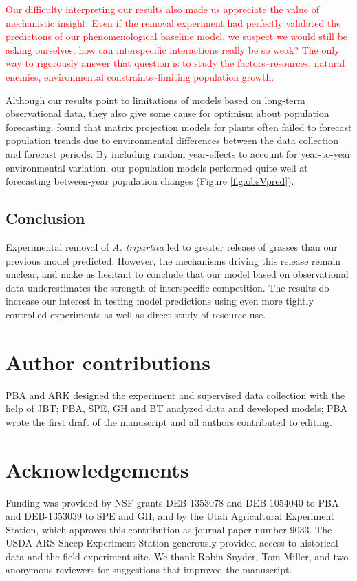 \documentclass[11pt]{article}
\newcommand{\new}{\textcolor{red}}
\begin{document}
\begin{doublespacing}
\new{Our difficulty interpreting our results also made us appreciate the value of mechanistic insight. Even if the removal experiment had perfectly validated the predictions of our phenomenological baseline model, we suspect we would still be asking ourselves, how can interspecific interactions really be so weak? The only way to rigorously answer that question is to study the factors--resources, natural enemies, environmental constraints--limiting population growth. }

Although our results point to limitations of models based on long-term observational data, they also give some cause for optimism about population forecasting. \citet{Crone2013} found that matrix projection models for plants often failed to forecast population trends due 
to environmental differences between the data collection and forecast periods. 
By including random year-effects to account for year-to-year environmental variation, our population models performed quite well
at forecasting between-year population changes (Figure \ref{fig:obsVpred}). 

\subsection*{Conclusion}

Experimental removal of \textit{A. tripartita} led to greater release of grasses than our previous model predicted. However, the mechanisms driving this release remain unclear, and make us hesitant to conclude that our model based on observational data underestimates the strength of interspecific competition. The results do increase our interest in testing model predictions using even more tightly controlled experiments as well as direct study of resource-use.

\section*{Author contributions}
PBA and ARK designed the experiment and supervised data collection with the help of JBT; PBA, SPE, GH and BT analyzed data and 
developed models; PBA wrote the first draft of the manuscript and all authors contributed to editing.

\section*{Acknowledgements}
Funding was provided by NSF grants DEB-1353078 and DEB-1054040 to PBA and DEB-1353039 to SPE and GH, and 
by the Utah Agricultural Experiment Station, which approves this contribution as journal paper number 9033. 
The USDA-ARS Sheep Experiment Station generously provided access to historical data and the field experiment site. 
We thank Robin Snyder, Tom Miller, and two anonymous reviewers for suggestions that improved the manuscript.


\end{doublespacing}
\end{document}
